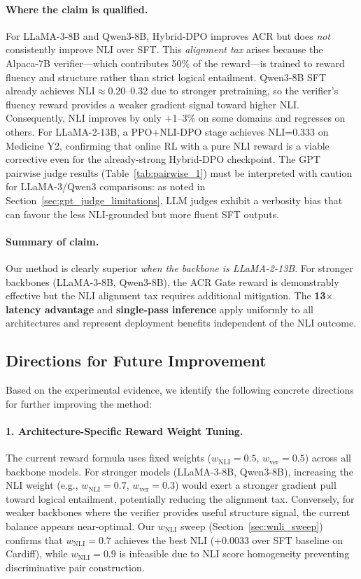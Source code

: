 \paragraph{Where the claim is qualified.}
For LLaMA-3-8B and Qwen3-8B, Hybrid-DPO improves ACR but does \emph{not} consistently improve NLI over SFT.
This \emph{alignment tax} arises because the Alpaca-7B verifier---which contributes 50\% of the reward---is trained to reward fluency and structure rather than strict logical entailment.
Qwen3-8B SFT already achieves NLI$\approx$0.20--0.32 due to stronger pretraining, so the verifier's fluency reward provides a weaker gradient signal toward higher NLI.
Consequently, NLI improves by only $+$1--3\% on some domains and regresses on others.
For LLaMA-2-13B, a PPO+NLI-DPO stage achieves NLI=0.333 on Medicine Y2, confirming that online RL with a pure NLI reward is a viable corrective even for the already-strong Hybrid-DPO checkpoint.
The GPT pairwise judge results (Table~\ref{tab:pairwise_1}) must be interpreted with caution for LLaMA-3/Qwen3 comparisons: as noted in Section~\ref{sec:gpt_judge_limitations}, LLM judges exhibit a verbosity bias that can favour the less NLI-grounded but more fluent SFT outputs.

\paragraph{Summary of claim.}
Our method is clearly superior \emph{when the backbone is LLaMA-2-13B}. For stronger backbones (LLaMA-3-8B, Qwen3-8B), the ACR Gate reward is demonstrably effective but the NLI alignment tax requires additional mitigation. The \textbf{13$\times$ latency advantage} and \textbf{single-pass inference} apply uniformly to all architectures and represent deployment benefits independent of the NLI outcome.

\subsection{Directions for Future Improvement}
\label{sec:future_improvements}

Based on the experimental evidence, we identify the following concrete directions for further improving the method:

\paragraph{1. Architecture-Specific Reward Weight Tuning.}
The current reward formula uses fixed weights ($w_\text{NLI}=0.5$, $w_\text{ver}=0.5$) across all backbone models.
For stronger models (LLaMA-3-8B, Qwen3-8B), increasing the NLI weight (e.g., $w_\text{NLI}=0.7$, $w_\text{ver}=0.3$) would exert a stronger gradient pull toward logical entailment, potentially reducing the alignment tax.
Conversely, for weaker backbones where the verifier provides useful structure signal, the current balance appears near-optimal.
Our $w_\text{NLI}$ sweep (Section~\ref{sec:wnli_sweep}) confirms that $w_\text{NLI}=0.7$ achieves the best NLI (+0.0033 over SFT baseline on Cardiff), while $w_\text{NLI}=0.9$ is infeasible due to NLI score homogeneity preventing discriminative pair construction.

